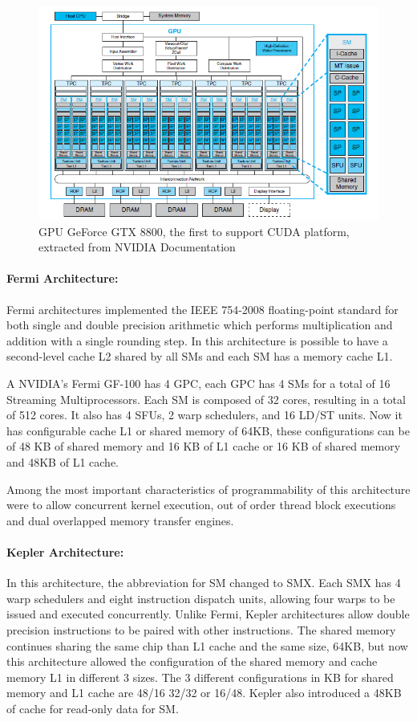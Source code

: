 \begin{figure}[htpb]
\centering
\includegraphics[scale=.85]{images/GeForce-8800-GTX-2-1.png}
\caption{GPU GeForce GTX 8800, the first to support CUDA platform, extracted  from NVIDIA Documentation}
\label{fig:GTX:8800}
\end{figure}

\paragraph{Fermi Architecture:} Fermi architectures implemented the IEEE 754-2008 floating-point standard \citep{FMA-IEEE} for both single and double precision arithmetic which performs multiplication and addition with a single rounding step. In this architecture is possible to have a second-level cache L2 shared by all SMs and each SM has a memory cache L1.

A NVIDIA's Fermi GF-100 has 4 GPC, each GPC has 4 SMs for a total of 16 Streaming Multiprocessors. Each SM is composed of 32 cores, resulting in a total of 512 cores. It also has 4 SFUs, 2 warp schedulers, and 16 LD/ST units. Now it has configurable cache L1 or shared memory of 64KB, these configurations can be of 48 KB of shared memory and 16 KB of L1 cache or 16 KB of shared memory and 48KB of L1 cache. 

Among the most important characteristics of programmability of this architecture were to allow concurrent kernel execution, out of order thread block executions and dual overlapped memory transfer engines.

\paragraph{Kepler Architecture:}
In this architecture, the abbreviation for SM changed to SMX. Each SMX has 4 warp schedulers and eight instruction dispatch units, allowing four warps to be issued and executed concurrently. Unlike Fermi, Kepler architectures allow double precision instructions to be paired with other instructions. The shared memory continues sharing the same chip than L1 cache and the same size, 64KB, but now this architecture allowed the configuration of the shared memory and cache memory L1 in different 3 sizes. The 3 different configurations in KB for shared memory and L1 cache are 48/16 32/32 or 16/48. Kepler also introduced a 48KB of cache for read‐only data for SM. 

